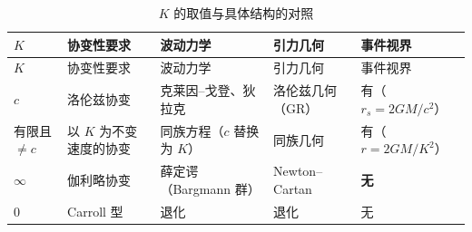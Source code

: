 \documentclass[
  chinese,
  a4paper,
  UTF8,
  12pt,
  oneside,
  openany]{ctexbook}
\theoremstyle{plain}
\theoremstyle{plain}
\theoremstyle{plain}
\theoremstyle{definition}
\theoremstyle{plain}
\theoremstyle{plain}
\theoremstyle{remark}
\begin{document}
\begin{longtable}[]{@{}
  >{\raggedright\arraybackslash}p{}
  >{\raggedright\arraybackslash}p{}
  >{\raggedright\arraybackslash}p{}
  >{\raggedright\arraybackslash}p{}
  >{\raggedright\arraybackslash}p{}@{}}
\caption{\(K\)
的取值与具体结构的对照}\label{tbl-isg-applications}\tabularnewline
\toprule\noalign{}
\begin{minipage}[b]{\linewidth}\raggedright
\(K\)
\end{minipage} & \begin{minipage}[b]{\linewidth}\raggedright
协变性要求
\end{minipage} & \begin{minipage}[b]{\linewidth}\raggedright
波动力学
\end{minipage} & \begin{minipage}[b]{\linewidth}\raggedright
引力几何
\end{minipage} & \begin{minipage}[b]{\linewidth}\raggedright
事件视界
\end{minipage} \\
\midrule\noalign{}
\endfirsthead
\toprule\noalign{}
\begin{minipage}[b]{\linewidth}\raggedright
\(K\)
\end{minipage} & \begin{minipage}[b]{\linewidth}\raggedright
协变性要求
\end{minipage} & \begin{minipage}[b]{\linewidth}\raggedright
波动力学
\end{minipage} & \begin{minipage}[b]{\linewidth}\raggedright
引力几何
\end{minipage} & \begin{minipage}[b]{\linewidth}\raggedright
事件视界
\end{minipage} \\
\midrule\noalign{}
\endhead
\bottomrule\noalign{}
\endlastfoot
\(c\) & 洛伦兹协变 & 克莱因--戈登、狄拉克 & 洛伦兹几何（GR） &
有（\(r_s=2GM/c^{2}\)） \\
有限且 \(\neq c\) & 以 \(K\) 为不变速度的协变 & 同族方程（\(c\) 替换为
\(K\)） & 同族几何 & 有（\(r=2GM/K^{2}\)） \\
\(\infty\) & 伽利略协变 & 薛定谔（Bargmann 群） & Newton--Cartan &
\textbf{无} \\
\(0\) & Carroll 型 & 退化 & 退化 & 无 \\
\end{longtable}
\end{document}
